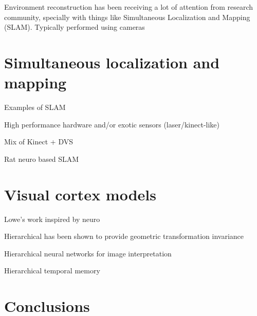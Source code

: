Environment reconstruction has been receiving a lot of attention from research  community, specially with things like Simultaneous Localization and Mapping (SLAM). Typically performed using cameras


\section{Simultaneous localization and mapping}

Examples of SLAM

High performance hardware and/or exotic sensors (laser/kinect-like)

Mix of Kinect + DVS

Rat neuro based SLAM


\section{Visual cortex models}

Lowe's work inspired by neuro

Hierarchical has been shown to provide geometric transformation invariance

Hierarchical neural networks for image interpretation

Hierarchical temporal memory 

\section{Conclusions}
